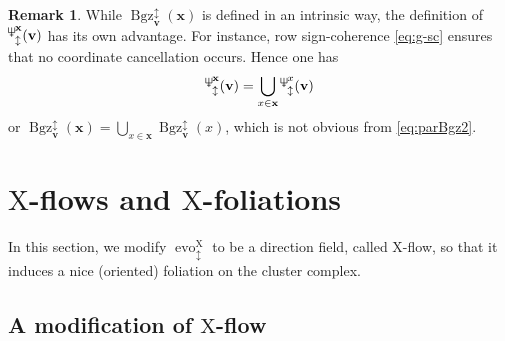 \documentclass[11pt,reqno]{amsart}
\newcommand{\Neptune}{\mathord{\text{\tikz[baseline=-.5ex,scale=.13]{\draw[line width=.45pt] (0,0)--(0,1.8) (-.6,1.8)--(-.6,.8)--(.6,.8)--(.6,1.8) (-.35,.35)--(.35,.35);}}}}
\theoremstyle{plain}
\theoremstyle{definition}
\newtheorem{remark}[theorem]{Remark}
\numberwithin{equation}{section}
\newcommand{\note}[1]{{\color{blue}#1}}
\newcommand\<{\langle}
\renewcommand\>{\rangle}
\newcommand{\on}[1]{\operatorname{#1}}
\def\vv{\mathbf{v}}
\def\sink{X}
\newcommand{\flowdu}[1]{\on{evo}_{\updownarrow}^{#1}}
\newcommand{\ccpt}[1]{\mathrm{#1}}%
\def\xevo{\ccpt{X}}%
\def\xx{\mathbf{x}}%
\def\coex{a}
\newcommand{\Bgzpm}[2]{\operatorname{Bgz}^{\updownarrow}_{#2}(#1)}
\newcommand{\suppdu}[1]{\operatorname{\Neptune}_{\updownarrow}^{#1}}
\newcommand{\DT}[1]{#1^{\vee}}
\def\Xevo{\DT{\ccpt{X}}}
\begin{document}
\begin{remark}\label{rem:union}
While $\Bgzpm{\xx}{\vv}$ is defined in an intrinsic way,
the definition of $\suppdu{\xx}(\vv)$ has its own advantage.
For instance, row sign-coherence \eqref{eq:g-sc} ensures that no coordinate cancellation occurs. 
Hence one has
\[
    \suppdu{\xx}(\vv)=\bigcup_{x\in\xx} \suppdu{x}(\vv)
\]
or $\Bgzpm{\xx}{\vv}=\bigcup_{x\in\xx}\Bgzpm{x}{\vv}$, which is not obvious from \eqref{eq:parBgz2}.
\end{remark}










\section{\texorpdfstring{$\xevo$-\EVO flows and $\xevo$-foliations}{X-evo flows and X-foliations}}\label{sec:evoCC}

In this section, we modify $\flowdu{\xevo}$ to be a direction field, called $\xevo$-\EVO flow,
so that it induces a nice (oriented) foliation on the cluster complex.


\subsection{A modification of $\xevo$-\EVO flow}\label{sec:evo}\
\end{document}
